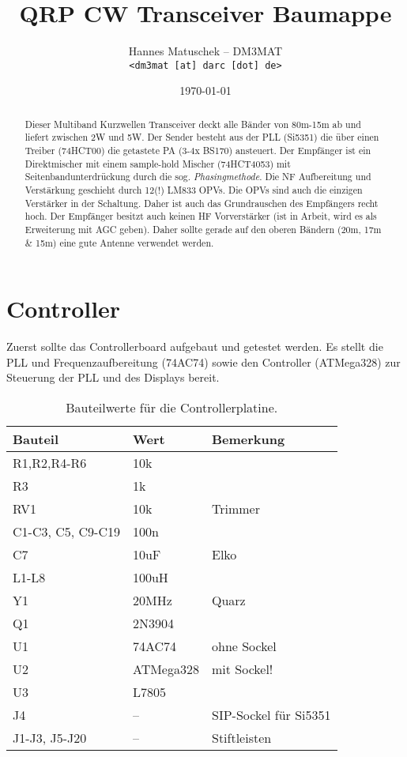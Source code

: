 \documentclass[10pt, a4paper]{paper}
\title{QRP CW Transceiver Baumappe}
\author{Hannes Matuschek -- DM3MAT\\\texttt{<dm3mat [at] darc [dot] de>}}
\date{\today}
\begin{document}
\maketitle

\begin{abstract}
Dieser Multiband Kurzwellen Transceiver deckt alle Bänder von 80m-15m ab und liefert zwischen 2W und 5W. Der Sender besteht aus der PLL (Si5351) die über einen Treiber (74HCT00) die getastete PA (3-4x BS170) ansteuert. Der Empfänger ist ein Direktmischer mit einem sample-hold Mischer (74HCT4053) mit Seitenbandunterdrückung durch die sog. \emph{Phasingmethode}. Die NF Aufbereitung und Verstärkung geschieht durch 12(!) LM833 OPVs. Die OPVs sind auch die einzigen Verstärker in der Schaltung. Daher ist auch das Grundrauschen des Empfängers recht hoch. Der Empfänger besitzt auch keinen HF Vorverstärker (ist in Arbeit, wird es als Erweiterung mit AGC geben). Daher sollte gerade auf den oberen Bändern (20m, 17m \& 15m) eine gute Antenne verwendet werden. 
\end{abstract}

\section{Controller}
Zuerst sollte das Controllerboard aufgebaut und getestet werden. Es stellt die PLL und Frequenzaufbereitung (74AC74) sowie den Controller (ATMega328) zur Steuerung der PLL und des Displays bereit. 

\begin{table}[!ht]
\centering
\begin{tabular}{|l|l|l|}
\hline 
Bauteil & Wert & Bemerkung \\ \hline 
R1,R2,R4-R6 & 10k & \\
R3 & 1k & \\
RV1 & 10k & Trimmer\\
C1-C3, C5, C9-C19 & 100n & \\
C7 & 10uF & Elko \\
L1-L8 & 100uH & \\
Y1 & 20MHz & Quarz \\
Q1 & 2N3904 & \\
U1 & 74AC74 & ohne Sockel \\
U2 & ATMega328 & mit Sockel! \\
U3 & L7805 & \\
J4 & -- & SIP-Sockel für Si5351 \\
J1-J3, J5-J20 & -- & Stiftleisten \\\hline
\end{tabular}
\caption{Bauteilwerte für die Controllerplatine.}
\end{table}
\end{document}
